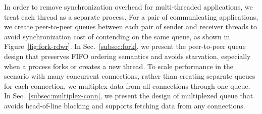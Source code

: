 In order to remove synchronization overhead for multi-threaded applications, we treat each thread as a separate process.
For a pair of communicating applications, we create peer-to-peer queues between each pair of sender and receiver threads to avoid synchronization cost of contending on the same queue, as shown in Figure~\ref{fig:fork-rdwr}.
In Sec.~\ref{subsec:fork}, we present the peer-to-peer queue design that preserves FIFO ordering semantics and avoids starvation, especially when a process forks or creates a new thread.
To scale performance in the scenario with many concurrent connections, rather than creating separate queues for each connection, we multiplex data from all connections through one queue.
In Sec.~\ref{subsec:multiplex-conn}, we present the design of multiplexed queue that avoids head-of-line blocking and supports fetching data from any connections.




